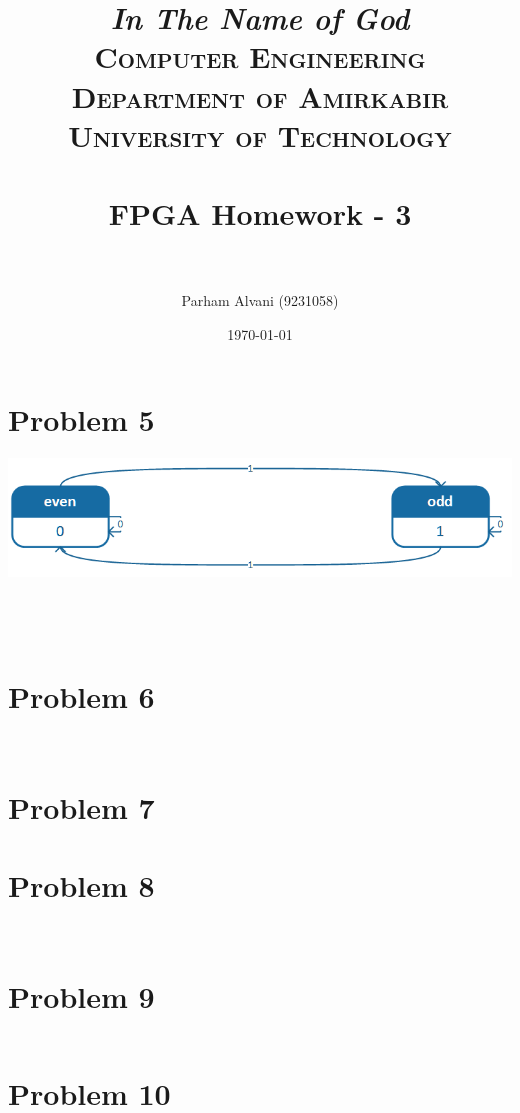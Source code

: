 \documentclass[paper=a4, fontsize=11pt]{scrartcl} %
\title{
\normalfont \normalsize
\textit{In The Name of God} \\
\textsc{Computer Engineering Department of Amirkabir University of Technology} \\ [25pt]
\horrule{0.5pt} \\[0.4cm] %
\huge FPGA Homework - 3 \\ %
\horrule{2pt} \\[0.5cm] %
}
\author{Parham Alvani (9231058)}
\date{\normalsize\today}
\numberwithin{equation}{section} %
\numberwithin{figure}{section} %
\numberwithin{table}{section} %
\begin{document}
\maketitle


\section{Problem 5}
\center\includegraphics[]{p5.png}\\
\inputminted{vhdl}{src/p5/parity-generator.vhd}
\inputminted{vhdl}{src/p5/shift-register.vhd}
\inputminted{vhdl}{src/p5/p5_t.vhd}
\inputminted{vhdl}{src/p5/p5.vhd}


\section{Problem 6}
\inputminted{vhdl}{src/p6/p6-2.vhd}
\inputminted{vhdl}{src/p6/p6-3.vhd}


\section{Problem 7}


\section{Problem 8}
\inputminted{vhdl}{src/p8/p8.vhd}
\inputminted{vhdl}{src/p8/p8_t.vhd}


\section{Problem 9}
\inputminted{vhdl}{src/p9/p9.vhd}


\section{Problem 10}
\inputminted{vhdl}{src/p10/p10.vhd}
\end{document}
